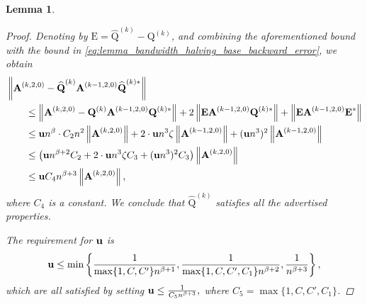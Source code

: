\documentclass{article}
\newcommand{\lnorm}{\left\|}
\newcommand{\rnorm}{\right\|}
\newcommand{\lcurly}{\left\{}
\newcommand{\rcurly}{\right\}}
\newcommand{\lpar}{\left(}
\newcommand{\rpar}{\right)}
\newtheorem{lemma}{Lemma}[section]
\newcommand\matA{\boldsymbol{\mathrm{A}}}
\newcommand\matE{\boldsymbol{\mathrm{E}}}
\newcommand\matQ{\boldsymbol{\mathrm{Q}}}
\newcommand\matQhat{\widehat{\boldsymbol{\mathrm{Q}}}}
\newcommand{\umach}{\textbf{\textup{u}}}
\newcommand{\cmm}{\beta}
\begin{document}
\begin{lemma}
\begin{proof}
        
        Denoting by $\matE=\matQhat^{(k)} - \matQ^{(k)}$, and combining the aforementioned bound with the bound in \ref{eq:lemma_bandwidth_halving_base_backward_error}, we obtain
        \begin{align*}
            &\lnorm
                \matA^{(k,2,0)} - \matQhat^{(k)}\matA^{(k-1,2,0)}\matQhat^{(k)*}
            \rnorm
            \\
            &\qquad\leq
            \lnorm
                \matA^{(k,2,0)} - \matQ^{(k)}\matA^{(k-1,2,0)}\matQ^{(k)*}
            \rnorm
            +
            2
            \lnorm
            \matE\matA^{(k-1,2,0)}\matQ^{(k)*}
            \rnorm
            +
            \lnorm
            \matE\matA^{(k-1,2,0)}\matE^*
            \rnorm
            \\
            &\qquad\leq
            \umach n^{\cmm}
            \cdot
                C_2n^2
                \lnorm\matA^{(k,2,0)}\rnorm
            +
            2
            \cdot
            \umach n^3
            \zeta
            \lnorm
            \matA^{(k-1,2,0)}
            \rnorm            
            +
            (\umach n^3)^2
            \lnorm
            \matA^{(k-1,2,0)}
            \rnorm
            \\
            &\qquad\leq
            \lpar
                \umach n^{\cmm+2}
                    C_2
                +
                2
                \cdot
                \umach n^3
                \zeta
                C_3            
                +
                (\umach n^3)^2
                C_3
            \rpar
            \lnorm\matA^{(k,2,0)}\rnorm
            \\
            &\qquad\leq
            \umach C_4n^{\cmm+3}
            \lnorm\matA^{(k,2,0)}\rnorm,
        \end{align*}
        where $C_4$ is a constant. We conclude that $\matQhat^{(k)}$ satisfies all the advertised properties.

        The requirement for $\umach$ is
        \begin{align*}
            \umach \leq \min \lcurly
                \frac{1}{\max\{1,C,C'\}n^{\cmm+1}},
                \frac{1}{\max\{1,C,C',C_1\}n^{\cmm+2}},
                \frac{1}{n^{\cmm+3}}
            \rcurly,
        \end{align*}
        which are all satisfied by setting
        $
            \umach \leq \frac{1}{C_5n^{\cmm+3}},
        $
        where $C_5=\max\{1,C,C',C_1\}$.
    \end{proof}
\end{lemma}
\end{document}
